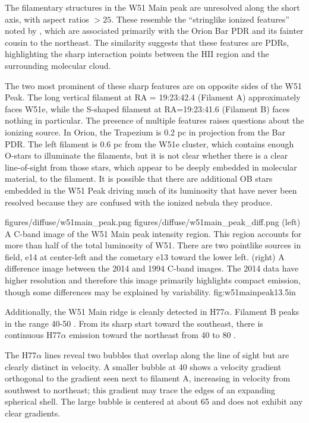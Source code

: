 The filamentary structures in the W51 Main peak are unresolved along the short
axis, with aspect ratios $>25$.   These resemble the ``stringlike ionized
features'' noted by \citet[][see
\url{http://images.nrao.edu/402}]{Yusef-Zadeh1990a}, which are associated
primarily with the Orion Bar PDR and its fainter cousin to the northeast.  The
similarity suggests that these features are PDRs, highlighting the sharp
interaction points between the HII region and the surrounding molecular cloud.

The two most prominent of these sharp features are on opposite sides of the W51
Peak.  The long vertical filament at RA = 19:23:42.4 (Filament A) approximately
faces W51e, while the S-shaped filament at RA=19:23:41.6 (Filament B) faces
nothing in particular.  The presence of multiple features raises questions
about the ionizing source.  In Orion, the Trapezium is 0.2 pc in projection
from the Bar PDR.  The left filament is 0.6 pc from the W51e cluster, which
contains enough O-stars to illuminate the filaments, but it is not clear
whether there is a clear line-of-sight from those stars, which appear to be
deeply embedded in molecular material, to the filament.  It is possible that
there are additional OB stars embedded in the W51 Peak driving much of its
luminosity that have never been resolved because they are confused with the
ionized nebula they produce.

\FigureTwo
{figures/diffuse/w51main_peak.png}
{figures/diffuse/w51main_peak_diff.png}
{(left) A C-band image of the W51 Main peak intensity region.  This region
accounts for more than half of the total luminosity of W51.  There are two
pointlike sources in field, e14 at center-left and the cometary e13 toward the
lower left. (right) A difference image between the 2014 and 1994 C-band images.
The 2014 data have higher resolution and therefore this image primarily
highlights compact emission, though some differences may be explained by
variability.}
{fig:w51mainpeak}{1}{3.5in}

Additionally, the W51 Main ridge is cleanly detected in H77$\alpha$.  Filament
B peaks in the range 40-50 \kms.  From its sharp start toward the southeast,
there is continuous H77$\alpha$ emission toward the northeast from 40 to 80
\kms.

The H77$\alpha$ lines reveal two bubbles that overlap along the line of sight but
are clearly distinct in velocity.  A smaller bubble at 40 \kms shows a velocity
gradient orthogonal to the gradient seen next to filament A, increasing in
velocity from southwest to northeast; this gradient may trace the edges of an expanding
spherical shell.  The large bubble is centered at about 65 \kms and does not
exhibit any clear gradients.

